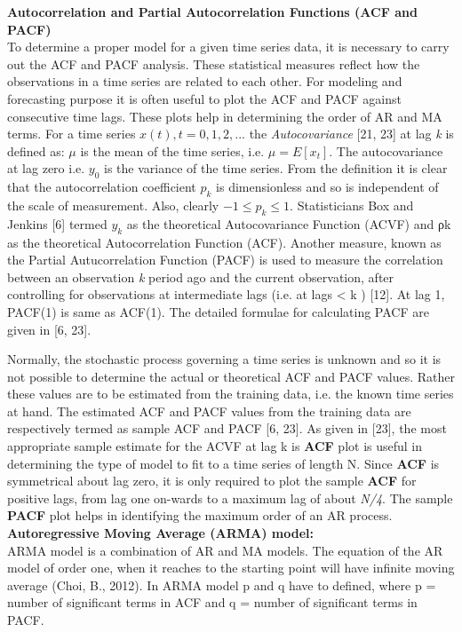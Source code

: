 \documentclass[10pt]{report}
\begin{document}
\begin{flushleft}
		\textbf{Autocorrelation and Partial Autocorrelation Functions (ACF and PACF) }\\
		To determine a proper model for a given time series data, it is necessary to carry out the ACF and PACF analysis. These statistical measures reflect how the observations in a time series are related to each other. For modeling and forecasting purpose it is often useful to plot the ACF and PACF against consecutive time lags. These plots help in determining the order of AR and MA terms. For a time series $ {x(t),t = 0,1, 2,...} $ the \emph{Autocovariance} [21, 23] at lag \emph{k} is defined as:
		$\mu$ is the mean of the time series, i.e. $ \mu = E\left[x_{t}\right]  $. The autocovariance at lag zero i.e. $ y_{0} $ is the variance of the time series. From the definition it is clear that the autocorrelation coefficient $ p_{k} $ is dimensionless and so is independent of the scale of measurement. Also, clearly $ -1 \leq p_{k} \leq 1 $. Statisticians Box and Jenkins [6] termed $ y_{k} $ as the theoretical Autocovariance Function (ACVF) and ρk as the theoretical Autocorrelation Function (ACF). 
		Another measure, known as the Partial Autucorrelation Function (PACF) is used to measure the correlation between an observation \emph{k} period ago and the current observation, after controlling for observations at intermediate lags (i.e. at lags < k ) [12]. At lag 1, PACF(1) is same as ACF(1). The detailed formulae for calculating PACF are given in [6, 23]. 
		
		
		
		Normally, the stochastic process governing a time series is unknown and so it is not possible to determine the actual or theoretical ACF and PACF values. Rather these values are to be estimated from the training data, i.e. the known time series at hand. The estimated ACF and PACF values from the training data are respectively termed as sample ACF and PACF [6, 23].  
		As given in [23], the most appropriate sample estimate for the ACVF at lag k is  \textbf{ACF} plot is useful in determining the type of model to fit to a time series of length N. Since \textbf{ACF} is symmetrical about lag zero, it is only required to plot the sample \textbf{ACF} for positive lags, from lag one on-wards to a maximum lag of about \emph{N/4}. The sample \textbf{PACF} plot helps in identifying the maximum order of an AR process.
		\textbf{Autoregressive Moving Average (ARMA) model:}\\
		
		ARMA model is a combination of AR and MA models. The equation of the AR model of order one, when it reaches to the starting point will have infinite moving average (Choi, B., 2012). In ARMA model p and q have to defined, where p = number of significant terms in ACF and q = number of significant terms in PACF.\\
		

\end{flushleft}
\end{document}
